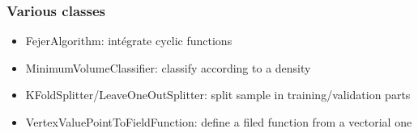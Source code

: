 \documentclass{beamer}
\begin{document}
\begin{frame}[containsverbatim]
\frametitle{Various classes}

% 

\begin{itemize}
\item FejerAlgorithm: intégrate cyclic functions
\item MinimumVolumeClassifier: classify according to a density
\item KFoldSplitter/LeaveOneOutSplitter: split sample in training/validation parts
\item VertexValuePointToFieldFunction: define a filed function from a vectorial one
\end{itemize}


\end{frame}

% 
% 
% 
% 


% 
% 
% 
% 
% 
% 
\end{document}
